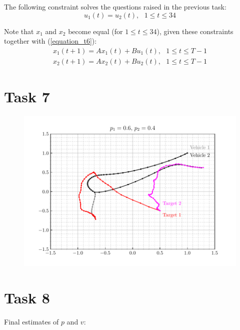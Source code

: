 \documentclass[12pt]{article}
\begin{document}
The following constraint solves the questions raised in the previous task: \\
\vspace{-0.3em}
\begin{equation}
    \label{equation_t6}
    u_1(t) = u_{2}(t), \> \> \> 1 \le t \le 34
\end{equation}

Note that $x_1$ and $x_2$ become equal (for $1 \le t \le 34$), given these constraints together with (\ref{equation_t6}): \\
\vspace{-1.6em}
\begin{align*}
    x_1(t+1) = A x_1(t) + B u_1(t), \> \> \> 1 \le t \le T-1 \\
    x_2(t+1) = A x_2(t) + B u_2(t), \> \> \> 1 \le t \le T-1
\end{align*}

\section{Task 7}

\begin{figure}[H]
    \centering
    \includegraphics{../../src/tasks_5-7/output/ex_7.pdf}
\end{figure}

\section{Task 8}

Final estimates of $p$ and $v$:
\end{document}
